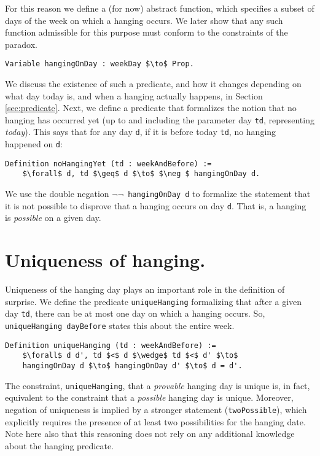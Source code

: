 \documentclass[runningheads]{llncs}
\begin{document}
For this reason we define a (for now) abstract function, which specifies a subset of
days of the week on which a hanging occurs. We later show that any such function
admissible for this purpose must conform to the constraints of the paradox.

\begin{lstlisting}[mathescape=true]
  Variable hangingOnDay : weekDay $\to$ Prop.
\end{lstlisting}

We discuss the existence of such a predicate, and how it changes depending
on what day today is, and when a hanging actually happens, in Section \ref{sec:predicate}.
Next, we define a predicate that formalizes the notion that no hanging has occurred
yet (up to and including the parameter day {\tt td}, representing \emph{today}).
This says that for any day {\tt d}, if it is before today {\tt td}, no hanging
happened on {\tt d}:

\begin{lstlisting}[mathescape=true]
  Definition noHangingYet (td : weekAndBefore) :=
    $\forall$ d, td $\geq$ d $\to$ $\neg $ hangingOnDay d.
\end{lstlisting}

We use the double negation {\tt $\neg \neg$ hangingOnDay d} to formalize the statement that it is
not possible to disprove that a hanging occurs on day {\tt d}. That is, a hanging
is \emph{possible} on a given day.

\section{Uniqueness of hanging. }
\label{sec:unique}

Uniqueness of the hanging day plays an important role in the definition of surprise.
We define the predicate {\tt uniqueHanging} formalizing that after a given day {\tt td},
there can be at most one day on which a hanging occurs. So,
{\tt uniqueHanging dayBefore} states this about the entire week.

\begin{lstlisting}[mathescape=true]
  Definition uniqueHanging (td : weekAndBefore) :=
    $\forall$ d d', td $<$ d $\wedge$ td $<$ d' $\to$
    hangingOnDay d $\to$ hangingOnDay d' $\to$ d = d'.
\end{lstlisting}

The constraint, {\tt uniqueHanging}, that
a \emph{provable} hanging day is unique is, in fact, equivalent to the constraint
that a \emph{possible} hanging day is unique. Moreover, negation of uniqueness
is implied by a stronger statement ({\tt twoPossible}), which explicitly
requires the presence of at least two possibilities for the hanging date.
Note here also that this reasoning does not rely on any additional knowledge about
the hanging predicate.
\end{document}
